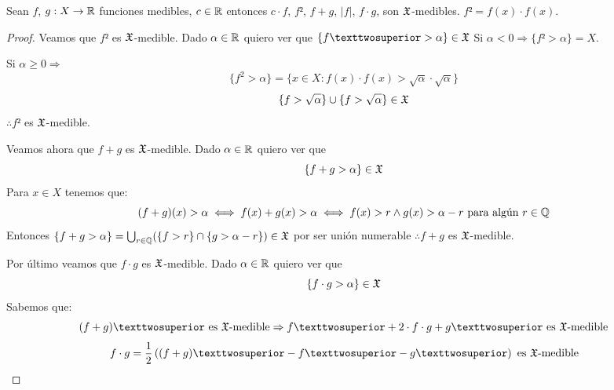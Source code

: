 \begin{lemma}
    Sean $f$, $g: X \to \mathbb{R}$ funciones medibles, $c \in \mathbb{R}$ entonces $c \cdot f$, $f²$, $f + g$, $|f|$, $f \cdot g$, son $\mathfrak{X}$-medibles.
    $f² = f(x) \cdot f(x)$.
    \begin{proof}
        Veamos que $f²$ es $\mathfrak{X}$-medible. Dado $\alpha \in \mathbb{R}$ quiero ver que $\{ f² > \alpha \} \in \mf{X}$
        Si $\alpha < 0 \Rightarrow \{ f² > \alpha \} = X$.

        Si $\alpha \geq 0 \Rightarrow$
        \begin{equation*}
            \{ f^2 > \alpha \} = \{ x \in X : f(x) \cdot f(x) > \sqrt{\alpha} \cdot \sqrt{\alpha} \}
        \end{equation*}
        \begin{equation*}
            \{ f > \sqrt{\alpha} \} \cup \{ f > \sqrt{\alpha} \} \in \mathfrak{X}
        \end{equation*} $\therefore f²$ es $\mathfrak{X}$-medible.

        Veamos ahora que $f + g$ es $\mathfrak{X}$-medible. Dado $\alpha \in \mathbb{R}$ quiero ver que \begin{equation*}
            \{ f + g > \alpha \} \in \mathfrak{X}
        \end{equation*}
        Para $x \in X$ tenemos que: \begin{equation*}
            (f+g)(x) > \alpha \iff f(x) + g(x) > \alpha \iff f(x) > r \land g(x) > \alpha - r \text{ para algún } r \in \mathbb{Q}
        \end{equation*}
        Entonces $\{ f + g > \alpha \} = \bigcup_{r \in \mathbb{Q}} (\{ f > r \} \cap \{ g > \alpha - r \}) \in \mathfrak{X}$ por ser unión numerable $\therefore f+g$ es $\mathfrak{X}$-medible.

        Por último veamos que $f \cdot g$ es $\mathfrak{X}$-medible. Dado $\alpha \in \mathbb{R}$ quiero ver que \begin{equation*}
            \{ f \cdot g > \alpha \} \in \mathfrak{X}
        \end{equation*}
        Sabemos que:
        \begin{equation*}
            (f+g)² \text{ es } \mf{X} \text{-medible} \Rightarrow f² + 2 \cdot f \cdot g + g² \text{ es } \mf{X} \text{-medible}
        \end{equation*}
        \begin{equation*}
            f \cdot g = \frac{1}{2} \left( (f+g)² - f² - g² \right) \text{ es } \mf{X} \text{-medible}
        \end{equation*}
    \end{proof}
\end{lemma}

